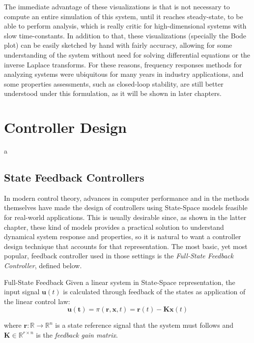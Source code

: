 \documentclass[a4paper,11pt]{book}
\numberwithin{figure}{chapter}
\numberwithin{equation}{chapter}
\numberwithin{table}{chapter}
\theoremstyle{definition}
\newtheorem{definition}{Definition}[chapter]
\newcounter{boxed-theorem}
\newcounter{boxed-definition}
\newenvironment{boxed-definition}[1]
{\begin{shaded} \begin{definition}{#1}}
{\end{definition} \end{shaded}}
\begin{document}
The immediate advantage of these visualizations is that is not necessary to compute an entire simulation of this system, until it reaches steady-state, to be able to perform analysis, which is really critic for high-dimensional systems with slow time-constants. In addition to that, these visualizations (specially the Bode plot) can be easily sketched by hand with fairly accuracy, allowing for some understanding of the system without need for solving differential equations or the inverse Laplace transforms. For these reasons, frequency responses methods for analyzing systems were ubiquitous for many years in industry applications, and some properties assessments, such as closed-loop stability, are still better understood under this formulation, as it will be shown in later chapters.

\clearpage
\chapter{Controller Design}

a

\section{State Feedback Controllers}

In modern control theory, advances in computer performance and in the methods themselves have made the design of controllers using State-Space models feasible for real-world applications. This is usually desirable since, as shown in the latter chapter, these kind of models provides a practical solution to understand dynamical system response and properties, so it is natural to want a controller design technique that accounts for that representation. The most basic, yet most popular, feedback controller used in those settings is the \textit{Full-State Feedback Controller}, defined below. 

\begin{boxed-definition}{Full-State Feedback}
	Given a linear system in State-Space representation, the input signal $\bm{u}(t)$ is calculated through feedback of the states as application of the linear control law:
	\begin{equation}
		\bm{u(t)} = \pi(\bm{r}, \bm{x}, t) = \bm{r}(t) - \bm{K} \bm{x}(t)
	\end{equation}
	
	\noindent where $\bm{r} : \mathbb{R} \rightarrow \mathbb{R}^{n}$ is a state reference signal that the system must follows and $\bm{K} \in \mathbb{R}^{r \times n}$ is the \textit{feedback gain matrix}.
\end{boxed-definition}
\end{document}
